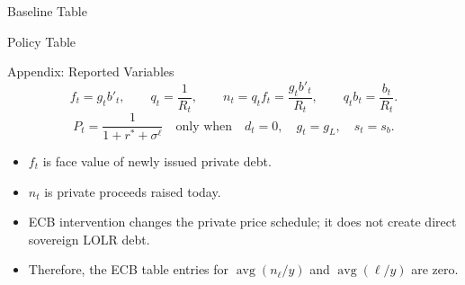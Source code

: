 \documentclass[aspectratio=169]{beamer}
\begin{document}
\begin{frame}[shrink=18]{Baseline Table}
\hypertarget{main-sim-table}{}
\scriptsize
\centering
\begingroup
\setlength{\tabcolsep}{4pt}
\renewcommand{\arraystretch}{0.92}

\endgroup
\end{frame}


\begin{frame}[shrink=18]{Policy Table}
\hypertarget{main-sim-table}{}
\scriptsize
\centering
\begingroup
\setlength{\tabcolsep}{4pt}
\renewcommand{\arraystretch}{0.92}

\endgroup

\end{frame}

\appendix


\begin{frame}{Appendix: Reported Variables}
\small
\[
f_t=g_t b'_t,
\qquad
q_t=\frac{1}{R_t},
\qquad
n_t=q_t f_t=\frac{g_t b'_t}{R_t},
\qquad
q_t b_t=\frac{b_t}{R_t}.
\]
\[
P_t=\frac{1}{1+r^\ast+\sigma^\ell}
\quad\text{only when}\quad
d_t=0,\quad g_t=g_L,\quad s_t=s_b.
\]

\medskip
\begin{itemize}
    \item $f_t$ is face value of newly issued private debt.
    \item $n_t$ is private proceeds raised today.
    \item ECB intervention changes the private price schedule; it does not create direct sovereign LOLR debt.
    \item Therefore, the ECB table entries for $\operatorname{avg}(n_\ell/y)$ and
          $\operatorname{avg}(\ell/y)$ are zero.
\end{itemize}

\medskip
\hyperlink{baseline-moments}{}
\end{frame}
\end{document}
